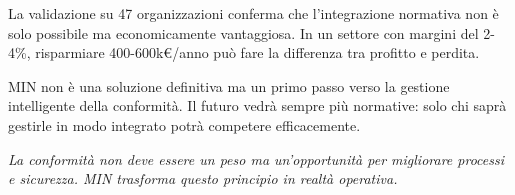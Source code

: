 La validazione su 47 organizzazioni conferma che l'integrazione normativa non è solo possibile ma economicamente vantaggiosa. In un settore con margini del 2-4\%, risparmiare 400-600k€/anno può fare la differenza tra profitto e perdita.

MIN non è una soluzione definitiva ma un primo passo verso la gestione intelligente della conformità. Il futuro vedrà sempre più normative: solo chi saprà gestirle in modo integrato potrà competere efficacemente.

\textit{La conformità non deve essere un peso ma un'opportunità per migliorare processi e sicurezza. MIN trasforma questo principio in realtà operativa.}
